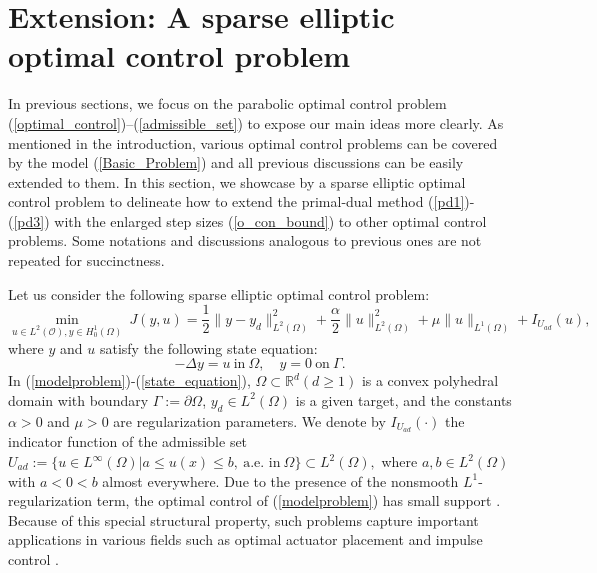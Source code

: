 \documentclass[final]{siamart171218}
\theoremstyle{remark}
\begin{document}
\section{Extension: A sparse elliptic optimal control problem}\label{se:se}
In previous sections, we focus on the parabolic optimal control problem (\ref{optimal_control})--(\ref{admissible_set}) to expose our main ideas more clearly. As mentioned in the introduction, various optimal control problems can be covered by the model (\ref{Basic_Problem}) and all previous discussions can be easily extended to them. In this section, we showcase by a sparse elliptic optimal control problem to delineate how to extend the primal-dual method (\ref{pd1})-(\ref{pd3}) with the enlarged step sizes (\ref{o_con_bound}) to other optimal control problems. Some notations and discussions analogous to previous ones are not repeated for succinctness.

Let us consider the following sparse elliptic optimal control problem:
\begin{equation}\label{modelproblem}
\underset{u\in L^2(\mathcal{O}),y\in H_0^1(\Omega)}{\min}~ J(y,u)=\frac{1}{2}\|y-y_d\|_{L^2(\Omega)}^2+\frac{\alpha}{2}\|u\|_{L^2(\Omega)}^2+{\mu}\|u\|_{L^1(\Omega)}+I_{U_{ad}}(u),
\end{equation}
where $y$ and $u$ satisfy the following state equation:
\begin{equation}\label{state_equation}
	-\Delta y=u ~ \text{in}~ \Omega, \quad
	y=0~ \text{on}~ \Gamma.
\end{equation}
In (\ref{modelproblem})-(\ref{state_equation}), {$\Omega\subset \mathbb{R}^d(d\ge 1)$ is a convex polyhedral domain} with boundary $\Gamma:=\partial\Omega$, $y_d\in L^2(\Omega)$ is a given target, and the constants $\alpha>0$ and $\mu>0$ are regularization parameters.
We denote by $I_{U_{ad}}(\cdot)$ the indicator function of the admissible set
$
	U_{ad}:=\{u\in L^\infty(\Omega)| a\leq u(x)\leq b, ~\text{a.e.~in}~ \Omega \}\subset L^2(\Omega),
$
where $a,b \in L^2(\Omega)$ with $a < 0 < b$ almost everywhere. Due to the presence of the nonsmooth $L^1$-regularization term,  the optimal control of (\ref{modelproblem}) has small support  \cite{stadler2009elliptic,wachsmuth2011}. Because of this special structural property, such problems capture important applications in various fields such as optimal actuator placement \cite{stadler2009elliptic} and impulse control \cite{ciaramella2016}.
\end{document}
